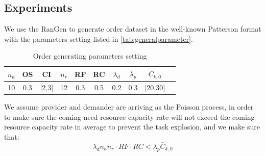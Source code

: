 
%     
%     
%     
%     
%     


\subsection{Experiments} %
\label{ssub:case_design}
We use the RanGen\cite{Demeulemeester2003} to generate order dataset in the well-known Patterson format with the parameters setting listed in \autoref{tab:generalparameter}. 
\begin{table}[htbp]
  \centering
  \scriptsize
  \caption{Order generating parameters setting}
    \begin{tabular}{cccccccccc}
    \toprule
    \textbf{$n_a$} & \textbf{OS} & \textbf{CI} & \textbf{$n_r$} & \textbf{RF} & \textbf{RC} & \textbf{$\lambda_d$} &\textbf{$\lambda_p$} & \textbf{$C_{k,0}$}\\
    \midrule
     10  &   0.3    &  [2,3]     &   12     &  0.3     &   0.5  & 0.2 & 0.3  & [20,30] \\
    \bottomrule
    \end{tabular}%
    {
    }
  \label{tab:generalparameter}%
\end{table}%
We assume provider and demander are arriving as the Poisson process, in order to make sure the coming need resource capacity rate will not exceed the coming resource capacity rate in average to prevent the task explosion, and we make sure that:
\begin{equation}
\lambda_d n_a n_r \cdot RF \cdot RC < \lambda_p \bar C_{k,0} \label{eq:balance}
\end{equation}

